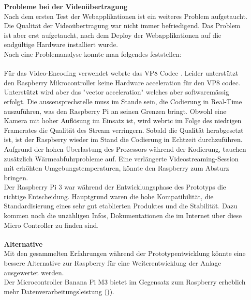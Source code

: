 \textbf{Probleme bei der Videoübertragung}
\\
Nach dem ersten Test der Webapplikationen ist ein weiteres Problem aufgetaucht. Die Qualität der Videoübertragung war nicht immer befriedigend. Das Problem ist aber erst aufgetaucht, nach dem Deploy der Webapplikationen auf die endgültige Hardware installiert wurde.
\\
Nach eine Problemanalyse konnte man folgendes feststellen:
\\
\\
Für das Video-Encoding verwendet \gls{webrtc} das VP8 Codec \cite{codecs}. Leider unterstützt den Raspberry Mikrocontroller keine Hardware acceleration für den VP8 codec. Unterstützt wird aber das "vector acceleration" welches aber softwaremässig erfolgt. Die \gls{aussensprechstelle} muss im Stande sein, die Codierung in Real-Time auszuführen, was den Raspberry Pi an seinen Grenzen bringt. Obwohl eine Kamera mit hoher Auflösung im Einsatz ist, wird \gls{webrtc} im Folge des niedrigen Framerates die Qualität des Stream verringern. Sobald die Qualität herabgesetzt ist, ist der Raspberry wieder im Stand die Codierung in Echtzeit durchzuführen. 
\\
Aufgrund der hohen Überlastung des Prozessors während der Kodierung, tauchen zusätzlich Wärmeabfuhrprobleme auf. Eine verlängerte Videostreaming-Session mit erhöhten Umgebungstemperaturen, könnte den Raspberry zum Absturz bringen.
\\
Der Raspberry Pi 3 war während der Entwicklungsphase des Prototyps die richtige Entscheidung. Hauptgrund waren die hohe Kompatibilität, die Standardisierung eines sehr gut etablierten Produktes und die Stabilität. Dazu kommen noch die unzähligen Infos, Dokumentationen die im Internet über diese Micro Controller zu finden sind.
\\
\\
\textbf{Alternative}
\label{ssec:alternative}
\\ 
Mit den gesammelten Erfahrungen während der Prototypentwicklung könnte eine bessere Alternative zur Raspberry für eine Weiterentwicklung der Anlage ausgewertet werden.
\\
Der Microcontroller Banana Pi M3 bietet im Gegensatz zum Raspberry erheblich mehr Datenverarbeitungsleistung ()).

